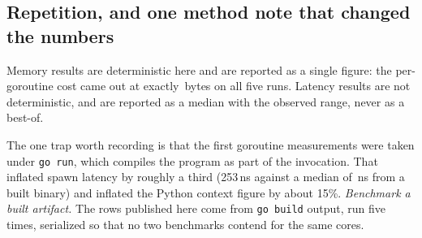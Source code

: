 \subsection{Repetition, and one method note that changed the numbers}

Memory results are deterministic here and are reported as a single figure: the
per-goroutine cost came out at exactly \rGoPer{}\,bytes on all five runs.
Latency results are not deterministic, and are reported as a median with the
observed range, never as a best-of.

The one trap worth recording is that the first goroutine measurements were taken
under \texttt{go run}, which compiles the program as part of the invocation.
That inflated spawn latency by roughly a third (253\,ns against a median of
\rGoSpawn{}\,ns from a built binary) and inflated the Python context figure by
about 15\%. \emph{Benchmark a built artifact.} The rows published here come from
\texttt{go build} output, run five times, serialized so that no two benchmarks
contend for the same cores.

